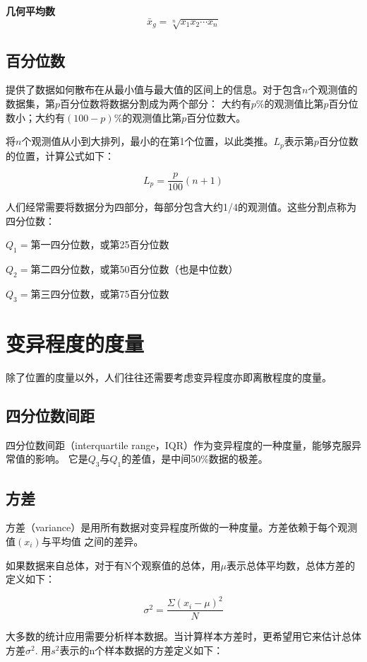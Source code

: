 \documentclass[a4paper]{ctexrep}
\begin{document}
\textbf{几何平均数}
\[\bar{x}_{g} = \sqrt[n]{x_{1}x_{2}\cdots x_{n}}\]

\subsection{百分位数}
提供了数据如何散布在从最小值与最大值的区间上的信息。对于包含$n$个观测值的数据集，第$p$百分位数将数据分割成为两个部分：
大约有$p\%$的观测值比第$p$百分位数小；大约有$(100-p)\%$的观测值比第$p$百分位数大。

将$n$个观测值从小到大排列，最小的在第1个位置，以此类推。$L_{p}$表示第$p$百分位数的位置，计算公式如下：
\begin{tcolorbox}[title = {第$p$百分位数位置}]
\[L_{p}=\frac{p}{100}(n+1)\]
\end{tcolorbox}

人们经常需要将数据分为四部分，每部分包含大约1/4的观测值。这些分割点称为四分位数：
\begin{tcolorbox}[title = {四分位数}]
$Q_{1}=$第一四分位数，或第25百分位数

$Q_{2}=$第二四分位数，或第50百分位数（也是中位数）

$Q_{3}=$第三四分位数，或第75百分位数
\end{tcolorbox}

\section{变异程度的度量}
除了位置的度量以外，人们往往还需要考虑变异程度亦即离散程度的度量。

\subsection{四分位数间距}
四分位数间距（interquartile range，IQR）作为变异程度的一种度量，能够克服异常值的影响。
它是$Q_{3}$与$Q_{1}$的差值，是中间50\%数据的极差。

\subsection{方差}
方差（variance）是用所有数据对变异程度所做的一种度量。方差依赖于每个观测值$(x_{i})$与平均值
之间的差异。

如果数据来自总体，对于有N个观察值的总体，用$\mu$表示总体平均数，总体方差的定义如下：

\[\sigma^{2}=\frac{\Sigma(x_{i}-\mu)^{2}}{N}\]

大多数的统计应用需要分析样本数据。当计算样本方差时，更希望用它来估计总体方差$\sigma^{2}$.
用$s^{2}$表示的n个样本数据的方差定义如下：
\end{document}
